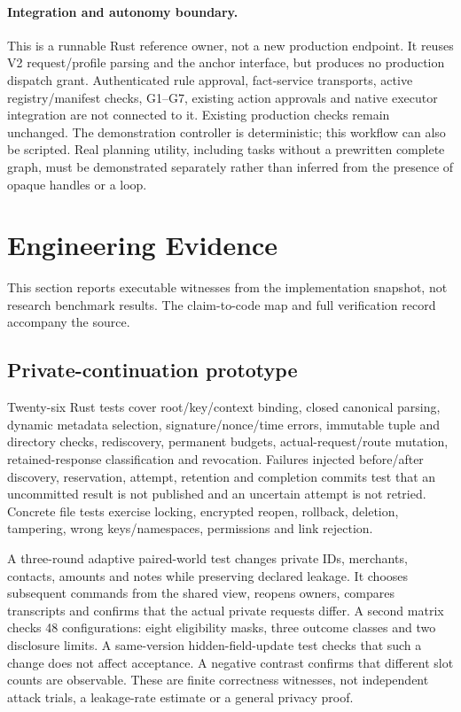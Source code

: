 \documentclass[letterpaper,twocolumn,10pt]{article}
\begin{document}
\paragraph{Integration and autonomy boundary.}
This is a runnable Rust reference owner, not a new production endpoint. It
reuses V2 request/profile parsing and the anchor interface, but produces no
production dispatch grant. Authenticated rule approval, fact-service transports,
active registry/manifest checks, G1--G7, existing action approvals and native
executor integration are not connected to it. Existing production checks remain
unchanged. The demonstration controller is deterministic; this workflow can
also be scripted. Real planning utility, including tasks without a prewritten
complete graph, must be demonstrated separately rather than inferred from the
presence of opaque handles or a loop.

\section{Engineering Evidence}
\label{sec:evidence}

This section reports executable witnesses from the implementation snapshot,
not research benchmark results. The claim-to-code map and full verification
record accompany the source.

\subsection{Private-continuation prototype}

Twenty-six Rust tests cover root/key/context binding, closed canonical parsing,
dynamic metadata selection, signature/nonce/time errors, immutable tuple and
directory checks, rediscovery, permanent budgets, actual-request/route mutation,
retained-response classification and revocation. Failures injected before/after
discovery, reservation, attempt, retention and completion commits test that an
uncommitted result is not published and an uncertain attempt is not retried.
Concrete file tests exercise locking, encrypted reopen, rollback, deletion,
tampering, wrong keys/namespaces, permissions and link rejection.

A three-round adaptive paired-world test changes private IDs, merchants,
contacts, amounts and notes while preserving declared leakage. It chooses
subsequent commands from the shared view, reopens owners, compares transcripts
and confirms that the actual private requests differ. A second matrix checks
48 configurations: eight eligibility masks, three outcome classes and two
disclosure limits. A same-version hidden-field-update test checks that such a
change does not affect acceptance. A negative contrast confirms that different
slot counts are observable. These are finite correctness witnesses, not
independent attack trials, a leakage-rate estimate or a general privacy proof.
\end{document}
